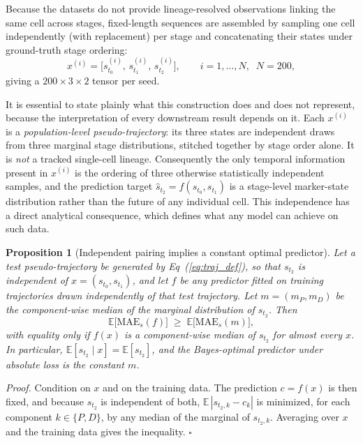 \documentclass[10pt,letterpaper]{article}
\newtheorem{proposition}{Proposition}
\begin{document}
Because the datasets do not provide lineage-resolved observations linking the same cell across stages, fixed-length sequences are assembled by sampling one cell independently (with replacement) per stage and concatenating their states under ground-truth stage ordering:
\begin{equation}
x^{(i)}=\big[s_{t_0}^{(i)},\,s_{t_1}^{(i)},\,s_{t_2}^{(i)}\big],
\qquad i=1,\dots,N,\;\; N=200,
\label{eq:traj_def}
\end{equation}
giving a $200\times 3\times 2$ tensor per seed.

It is essential to state plainly what this construction does and does not represent, because the interpretation of every downstream result depends on it. Each $x^{(i)}$ is a \emph{population-level pseudo-trajectory}: its three states are independent draws from three marginal stage distributions, stitched together by stage order alone. It is \emph{not} a tracked single-cell lineage. Consequently the only temporal information present in $x^{(i)}$ is the ordering of three otherwise statistically independent samples, and the prediction target $\hat{s}_{t_2}=f(s_{t_0},s_{t_1})$ is a stage-level marker-state distribution rather than the future of any individual cell. This independence has a direct analytical consequence, which defines what any model can achieve on such data.

\begin{proposition}[Independent pairing implies a constant optimal predictor]
\label{prop:null}
Let a test pseudo-trajectory be generated by Eq~(\ref{eq:traj_def}), so that $s_{t_2}$ is independent of $x=(s_{t_0},s_{t_1})$, and let $f$ be any predictor fitted on training trajectories drawn independently of that test trajectory. Let $m=(m_P,m_D)$ be the component-wise median of the marginal distribution of $s_{t_2}$. Then
\[
\mathbb{E}\big[\mathrm{MAE}_s(f)\big]\;\ge\;\mathbb{E}\big[\mathrm{MAE}_s(m)\big],
\]
with equality only if $f(x)$ is a component-wise median of $s_{t_2}$ for almost every $x$. In particular, $\mathbb{E}[s_{t_2}\mid x]=\mathbb{E}[s_{t_2}]$, and the Bayes-optimal predictor under absolute loss is the constant $m$.
\end{proposition}

\noindent\emph{Proof.} Condition on $x$ and on the training data. The prediction $c=f(x)$ is then fixed, and because $s_{t_2}$ is independent of both, $\mathbb{E}\,|s_{t_2,k}-c_k|$ is minimized, for each component $k\in\{P,D\}$, by any median of the marginal of $s_{t_2,k}$. Averaging over $x$ and the training data gives the inequality. $\square$
\end{document}
